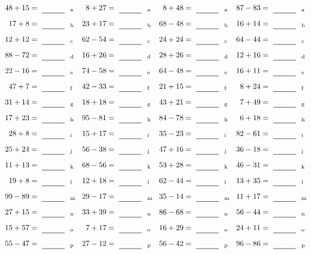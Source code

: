 \documentclass
[
  draft    = true,
  fontsize = 11pt,
  parskip  = half-
]
{scrartcl}
\begin{document}
\clearpage
\begin{align*}
    \pline{48+15}&=\rline{a}
  & \pline{8+27}&=\rline{a}
  & \pline{8+48}&=\rline{a}
  & \pline{87-83}&=\rline{a} \\[1ex]
    \pline{17+8}&=\rline{b}
  & \pline{23+17}&=\rline{b}
  & \pline{68-48}&=\rline{b}
  & \pline{16+14}&=\rline{b} \\[1ex]
    \pline{12+12}&=\rline{c}
  & \pline{62-54}&=\rline{c}
  & \pline{24+24}&=\rline{c}
  & \pline{64-44}&=\rline{c} \\[1ex]
    \pline{88-72}&=\rline{d}
  & \pline{16+26}&=\rline{d}
  & \pline{28+26}&=\rline{d}
  & \pline{12+16}&=\rline{d} \\[1ex]
    \pline{22-16}&=\rline{e}
  & \pline{74-58}&=\rline{e}
  & \pline{64-48}&=\rline{e}
  & \pline{16+11}&=\rline{e} \\[1ex]
    \pline{47+7}&=\rline{f}
  & \pline{42-33}&=\rline{f}
  & \pline{21+15}&=\rline{f}
  & \pline{8+24}&=\rline{f} \\[1ex]
    \pline{31+14}&=\rline{g}
  & \pline{18+18}&=\rline{g}
  & \pline{43+21}&=\rline{g}
  & \pline{7+49}&=\rline{g} \\[1ex]
    \pline{17+23}&=\rline{h}
  & \pline{95-81}&=\rline{h}
  & \pline{84-78}&=\rline{h}
  & \pline{6+18}&=\rline{h} \\[1ex]
    \pline{28+8}&=\rline{i}
  & \pline{15+17}&=\rline{i}
  & \pline{35-23}&=\rline{i}
  & \pline{82-61}&=\rline{i} \\[1ex]
    \pline{25+24}&=\rline{j}
  & \pline{56-38}&=\rline{j}
  & \pline{47+16}&=\rline{j}
  & \pline{36-18}&=\rline{j} \\[1ex]
    \pline{11+13}&=\rline{k}
  & \pline{68-56}&=\rline{k}
  & \pline{53+28}&=\rline{k}
  & \pline{46-31}&=\rline{k} \\[1ex]
    \pline{19+8}&=\rline{l}
  & \pline{12+18}&=\rline{l}
  & \pline{62-44}&=\rline{l}
  & \pline{13+35}&=\rline{l} \\[1ex]
    \pline{99-89}&=\rline{m}
  & \pline{29-17}&=\rline{m}
  & \pline{35-14}&=\rline{m}
  & \pline{11+17}&=\rline{m} \\[1ex]
    \pline{27+15}&=\rline{n}
  & \pline{33+39}&=\rline{n}
  & \pline{86-68}&=\rline{n}
  & \pline{56-44}&=\rline{n} \\[1ex]
    \pline{15+57}&=\rline{o}
  & \pline{7+17}&=\rline{o}
  & \pline{16+29}&=\rline{o}
  & \pline{24+11}&=\rline{o} \\[1ex]
    \pline{55-47}&=\rline{p}
  & \pline{27-12}&=\rline{p}
  & \pline{56-42}&=\rline{p}
  & \pline{96-86}&=\rline{p}
\end{align*}
\end{document}
